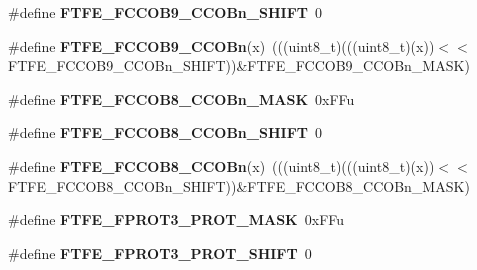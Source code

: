 \begin{DoxyCompactItemize}
\item 
\#define {\bfseries F\+T\+F\+E\+\_\+\+F\+C\+C\+O\+B9\+\_\+\+C\+C\+O\+Bn\+\_\+\+S\+H\+I\+FT}~0\hypertarget{group__FTFE__Register__Masks_gae878f577523db2f4b3e57defa8d0aa9f}{}\label{group__FTFE__Register__Masks_gae878f577523db2f4b3e57defa8d0aa9f}

\item 
\#define {\bfseries F\+T\+F\+E\+\_\+\+F\+C\+C\+O\+B9\+\_\+\+C\+C\+O\+Bn}(x)~(((uint8\+\_\+t)(((uint8\+\_\+t)(x))$<$$<$F\+T\+F\+E\+\_\+\+F\+C\+C\+O\+B9\+\_\+\+C\+C\+O\+Bn\+\_\+\+S\+H\+I\+FT))\&F\+T\+F\+E\+\_\+\+F\+C\+C\+O\+B9\+\_\+\+C\+C\+O\+Bn\+\_\+\+M\+A\+SK)\hypertarget{group__FTFE__Register__Masks_gad71cfcc7c31cfe8aee5f11aa4d6b2b74}{}\label{group__FTFE__Register__Masks_gad71cfcc7c31cfe8aee5f11aa4d6b2b74}

\item 
\#define {\bfseries F\+T\+F\+E\+\_\+\+F\+C\+C\+O\+B8\+\_\+\+C\+C\+O\+Bn\+\_\+\+M\+A\+SK}~0x\+F\+Fu\hypertarget{group__FTFE__Register__Masks_gab782fa18693d9a3113b2d58a492717b4}{}\label{group__FTFE__Register__Masks_gab782fa18693d9a3113b2d58a492717b4}

\item 
\#define {\bfseries F\+T\+F\+E\+\_\+\+F\+C\+C\+O\+B8\+\_\+\+C\+C\+O\+Bn\+\_\+\+S\+H\+I\+FT}~0\hypertarget{group__FTFE__Register__Masks_ga4d31b50304dbb610e569fd53dcb8eed5}{}\label{group__FTFE__Register__Masks_ga4d31b50304dbb610e569fd53dcb8eed5}

\item 
\#define {\bfseries F\+T\+F\+E\+\_\+\+F\+C\+C\+O\+B8\+\_\+\+C\+C\+O\+Bn}(x)~(((uint8\+\_\+t)(((uint8\+\_\+t)(x))$<$$<$F\+T\+F\+E\+\_\+\+F\+C\+C\+O\+B8\+\_\+\+C\+C\+O\+Bn\+\_\+\+S\+H\+I\+FT))\&F\+T\+F\+E\+\_\+\+F\+C\+C\+O\+B8\+\_\+\+C\+C\+O\+Bn\+\_\+\+M\+A\+SK)\hypertarget{group__FTFE__Register__Masks_ga9fde6899ba660799f46c3fe4ffd0d5fb}{}\label{group__FTFE__Register__Masks_ga9fde6899ba660799f46c3fe4ffd0d5fb}

\item 
\#define {\bfseries F\+T\+F\+E\+\_\+\+F\+P\+R\+O\+T3\+\_\+\+P\+R\+O\+T\+\_\+\+M\+A\+SK}~0x\+F\+Fu\hypertarget{group__FTFE__Register__Masks_gaa08f3df6f890d183bd5864a6d08dc3b9}{}\label{group__FTFE__Register__Masks_gaa08f3df6f890d183bd5864a6d08dc3b9}

\item 
\#define {\bfseries F\+T\+F\+E\+\_\+\+F\+P\+R\+O\+T3\+\_\+\+P\+R\+O\+T\+\_\+\+S\+H\+I\+FT}~0\hypertarget{group__FTFE__Register__Masks_ga92b7eeff49fd75ccb8b325326e70967d}{}\label{group__FTFE__Register__Masks_ga92b7eeff49fd75ccb8b325326e70967d}


\end{DoxyCompactItemize}
